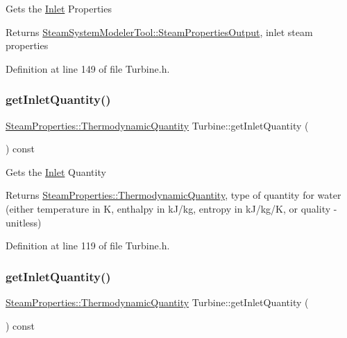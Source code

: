Gets the \hyperlink{class_inlet}{Inlet} Properties

\begin{DoxyReturn}{Returns}
\hyperlink{struct_steam_system_modeler_tool_1_1_steam_properties_output}{Steam\+System\+Modeler\+Tool\+::\+Steam\+Properties\+Output}, inlet steam properties 
\end{DoxyReturn}


Definition at line 149 of file Turbine.\+h.

\mbox{\label{class_turbine_ac9e91d9539cea5cd1e0037c397c28c78}} 
\subsubsection{\texorpdfstring{get\+Inlet\+Quantity()}{getInletQuantity()}\hspace{0.1cm}{\footnotesize\ttfamily [1/3]}}
{\footnotesize\ttfamily \hyperlink{class_steam_properties_ae0294bedf7d178c2d8fb6aed0f62fbff}{Steam\+Properties\+::\+Thermodynamic\+Quantity} Turbine\+::get\+Inlet\+Quantity (\begin{DoxyParamCaption}{ }\end{DoxyParamCaption}) const\hspace{0.3cm}{\ttfamily [inline]}}

Gets the \hyperlink{class_inlet}{Inlet} Quantity

\begin{DoxyReturn}{Returns}
\hyperlink{class_steam_properties_ae0294bedf7d178c2d8fb6aed0f62fbff}{Steam\+Properties\+::\+Thermodynamic\+Quantity}, type of quantity for water (either temperature in K, enthalpy in k\+J/kg, entropy in k\+J/kg/K, or quality -\/ unitless) 
\end{DoxyReturn}


Definition at line 119 of file Turbine.\+h.

\mbox{\label{class_turbine_ac9e91d9539cea5cd1e0037c397c28c78}} 
\subsubsection{\texorpdfstring{get\+Inlet\+Quantity()}{getInletQuantity()}\hspace{0.1cm}{\footnotesize\ttfamily [2/3]}}
{\footnotesize\ttfamily \hyperlink{class_steam_properties_ae0294bedf7d178c2d8fb6aed0f62fbff}{Steam\+Properties\+::\+Thermodynamic\+Quantity} Turbine\+::get\+Inlet\+Quantity (\begin{DoxyParamCaption}{ }\end{DoxyParamCaption}) const\hspace{0.3cm}{\ttfamily [inline]}}

